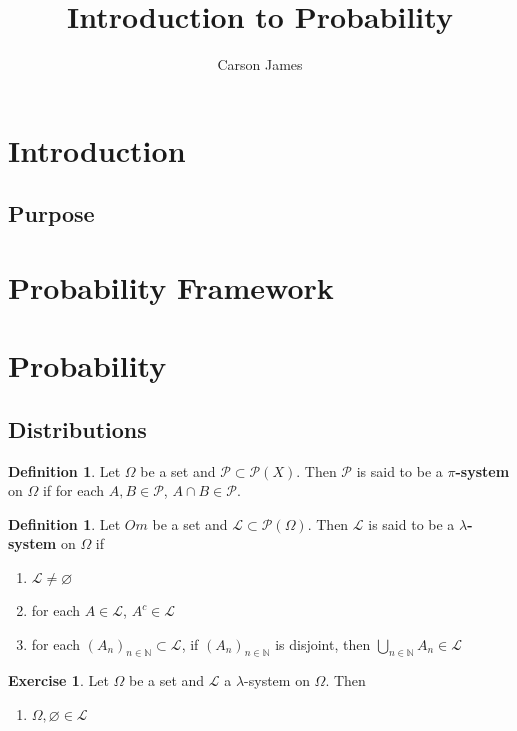 \documentclass[12pt]{amsart}
\theoremstyle{definition}
\newtheorem{defn}[definition]{Definition}
\newtheorem{ex}[definition]{Exercise}
\newcommand{\lam}{\lambda}
\newcommand{\Om}{\Omega}
\newcommand{\N}{\mathbb{N}}
\newcommand{\ML}{\mathcal{L}}
\newcommand{\MP}{\mathcal{P}}
\begin{document}
	
	\title{Introduction to Probability}
	\author{Carson James}
	\maketitle
	
	\tableofcontents
	
	\section{Introduction}
	
	\subsection{Purpose}
	
	\section{Probability Framework}
	
	\section{Probability}
	\subsection{Distributions}
	
	\begin{defn}
		Let $\Om$ be a set and $\MP \subset \MP(X)$. Then $\MP$ is said to be a \textbf{$\pi$-system} on $\Om$ if for each $A,B \in \MP$, $A \cap B \in \MP$.
	\end{defn}
	
	\begin{defn}
		Let $Om$ be a set and $\ML \subset \MP(\Om)$. Then $\ML$ is said to be a \textbf{$\lam$-system} on $\Om$ if 
		\begin{enumerate}
			\item $\ML \neq \varnothing$
			\item for each $A \in \ML$, $A^c \in \ML$
			\item for each $(A_n)_{n \in \N} \subset \ML$, if $(A_n)_{n \in \N}$ is disjoint, then $\bigcup\limits_{n \in \N}A_n \in \ML$
		\end{enumerate}
	\end{defn}
	
	\begin{ex}
		Let $\Om$ be a set and $\ML$ a $\lam$-system on $\Om$. Then 
		\begin{enumerate}
			\item $\Om, \varnothing \in \ML$
		\end{enumerate} 
	\end{ex}
	
\end{document}
